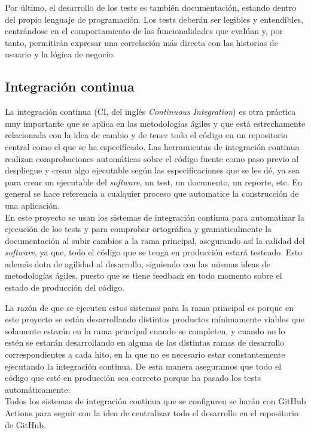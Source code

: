 Por último, el desarrollo de los tests es también documentación, estando dentro
del propio lenguaje de programación. Los tests deberán ser legibles y
entendibles, centrándose en el comportamiento de las funcionalidades que evalúan
y, por tanto, permitirán expresar una correlación más directa con las historias
de usuario y la lógica de negocio.

\subsection{Integración continua}
La integración continua (CI, del inglés \textit{Continuous Integration}) es otra
práctica muy importante que se aplica en las metodologías ágiles y que está
estrechamente relacionada con la idea de cambio y de tener todo el código en un
repositorio central como el que se ha especificado. Las herramientas de
integración continua realizan comprobaciones automáticas sobre el código fuente
como paso previo al despliegue y crean algo ejecutable según las
especificaciones que se les dé, ya sea para crear un ejecutable del
\textit{software}, un test, un documento, un reporte, etc. En general se hace
referencia a cualquier proceso que automatice la construcción de una
aplicación.\\

En este proyecto se usan los sistemas de integración continua para automatizar
la ejecución de los tests y para comprobar ortográfica y gramaticalmente la
documentación al subir cambios a la rama principal, asegurando así la calidad
del \textit{software}, ya que, todo el código que se tenga en producción estará
testeado. Esto además dota de agilidad al desarrollo, siguiendo con las mismas
ideas de metodologías ágiles, puesto que se tiene feedback en todo momento sobre
el estado de producción del código.

La razón de que se ejecuten estos sistemas para la rama principal es porque en
este proyecto se están desarrollando distintos productos mínimamente viables que
solamente estarán en la rama principal cuando se completen, y cuando no lo estén
se estarán desarrollando en alguna de las distintas ramas de desarrollo
correspondientes a cada hito, en la que no es necesario estar constantemente
ejecutando la integración continua. De esta manera aseguramos que todo el código
que esté en producción sea correcto porque ha pasado los tests
automáticamente.\\

Todos los sistemas de integración continua que se configuren se harán con GitHub
Actions para seguir con la idea de centralizar todo el desarrollo en el
repositorio de GitHub.

